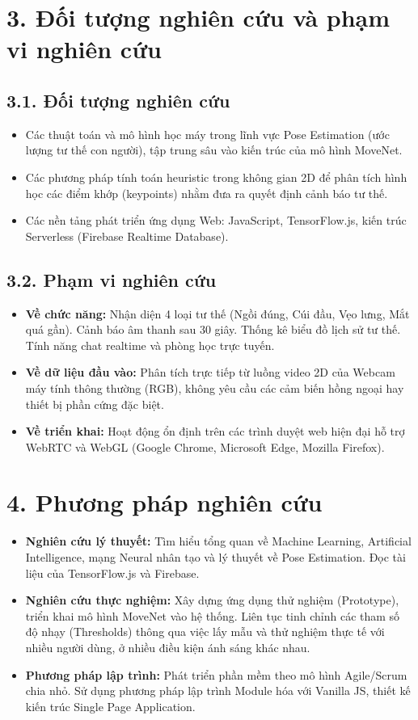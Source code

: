 \documentclass[12pt,a4paper]{report}
\begin{document}
\section*{3. Đối tượng nghiên cứu và phạm vi nghiên cứu}
\subsection*{3.1. Đối tượng nghiên cứu}
\begin{itemize}
    \item Các thuật toán và mô hình học máy trong lĩnh vực Pose Estimation (ước lượng tư thế con người), tập trung sâu vào kiến trúc của mô hình MoveNet.
    \item Các phương pháp tính toán heuristic trong không gian 2D để phân tích hình học các điểm khớp (keypoints) nhằm đưa ra quyết định cảnh báo tư thế.
    \item Các nền tảng phát triển ứng dụng Web: JavaScript, TensorFlow.js, kiến trúc Serverless (Firebase Realtime Database).
\end{itemize}

\subsection*{3.2. Phạm vi nghiên cứu}
\begin{itemize}
    \item \textbf{Về chức năng:} Nhận diện 4 loại tư thế (Ngồi đúng, Cúi đầu, Vẹo lưng, Mắt quá gần). Cảnh báo âm thanh sau 30 giây. Thống kê biểu đồ lịch sử tư thế. Tính năng chat realtime và phòng học trực tuyến.
    \item \textbf{Về dữ liệu đầu vào:} Phân tích trực tiếp từ luồng video 2D của Webcam máy tính thông thường (RGB), không yêu cầu các cảm biến hồng ngoại hay thiết bị phần cứng đặc biệt.
    \item \textbf{Về triển khai:} Hoạt động ổn định trên các trình duyệt web hiện đại hỗ trợ WebRTC và WebGL (Google Chrome, Microsoft Edge, Mozilla Firefox).
\end{itemize}

\section*{4. Phương pháp nghiên cứu}
\begin{itemize}
    \item \textbf{Nghiên cứu lý thuyết:} Tìm hiểu tổng quan về Machine Learning, Artificial Intelligence, mạng Neural nhân tạo và lý thuyết về Pose Estimation. Đọc tài liệu của TensorFlow.js và Firebase.
    \item \textbf{Nghiên cứu thực nghiệm:} Xây dựng ứng dụng thử nghiệm (Prototype), triển khai mô hình MoveNet vào hệ thống. Liên tục tinh chỉnh các tham số độ nhạy (Thresholds) thông qua việc lấy mẫu và thử nghiệm thực tế với nhiều người dùng, ở nhiều điều kiện ánh sáng khác nhau.
    \item \textbf{Phương pháp lập trình:} Phát triển phần mềm theo mô hình Agile/Scrum chia nhỏ. Sử dụng phương pháp lập trình Module hóa với Vanilla JS, thiết kế kiến trúc Single Page Application.
\end{itemize}
\end{document}
